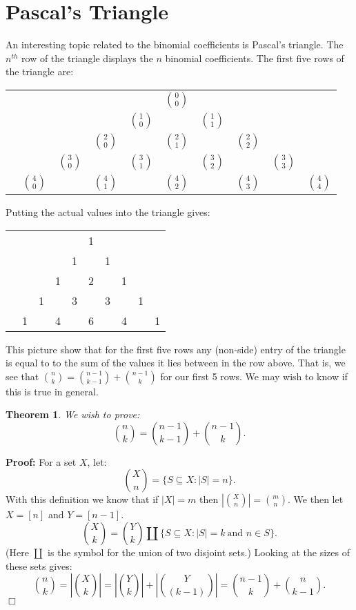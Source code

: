 \documentclass[11pt]{article}
\newtheorem{theorem}{Theorem}
\newenvironment{proof}{\noindent \textbf{Proof:}}{$\Box$}
\begin{document}
\section{Pascal's Triangle}
An interesting topic related to the binomial coefficients is Pascal's triangle. The $n^{th}$ row of the triangle displays the $n$ binomial coefficients. The first five rows of the triangle are:
\begin{center}
\begin{tabular}{cccccccccc}
&    &    &    &    &  $0\choose0$\\
&    &    &    & $1\choose0$ &    & $1\choose1$\\
&    &    & $2\choose0$ &    & $2\choose1$ &    & $2\choose2$\\
&    & $3\choose0$ &    & $3\choose1$ &    & $3\choose2$ &    &  $3\choose3$\\
& $4\choose0$ &    & $4\choose1$ &    & $4\choose2$ &    & $4\choose3$ &    &  $4\choose4$\\
\end{tabular}
\end{center}

Putting the actual values into the triangle gives:
\begin{center}
\begin{tabular}{cccccccccc}
&    &    &    &    &  1\\
&    &    &    &  1 &    &  1\\
&    &    &  1 &    &  2 &    &  1\\
&    &  1 &    &  3 &    &  3 &    &  1\\
&  1 &    &  4 &    &  6 &    &  4 &    &  1\\
\end{tabular}
\end{center}

This picture show that for the first five rows any (non-side) entry of the triangle is equal to to the sum of the values it lies between in the row above. That is, we see that ${n\choose k} = {{n-1} \choose {k-1}} + {{n-1} \choose {k}}$ for our first 5 rows. We may wish to know if this is true in general.

\begin{theorem}
We wish to prove:
	\[ {n\choose k} = {{n-1} \choose {k-1}} + {{n-1} \choose {k}}. \]
\end{theorem}

\begin{proof}
For a set $X$, let:
	\[{X \choose n}= \{S \subseteq X : |S| = n\}. \]
With this definition we know that if $|X|=m$ then $|{X \choose n }| = {m \choose n}$. We then let $X=[n]$ and $Y=[n-1]$.
	\[{X\choose k} = {Y\choose k} \coprod  \{S \subseteq X : |S| = k\ \mbox{and } n \in S\}.\]
(Here $\coprod$ is the symbol for the union of two disjoint sets.) Looking at the sizes of these sets gives:
	\[{n\choose k} = |{X\choose k}| = |{Y\choose k}| + |{Y\choose (k-1)}| = {n-1\choose k} + {n\choose k-1}.\]	
\end{proof}
\end{document}
